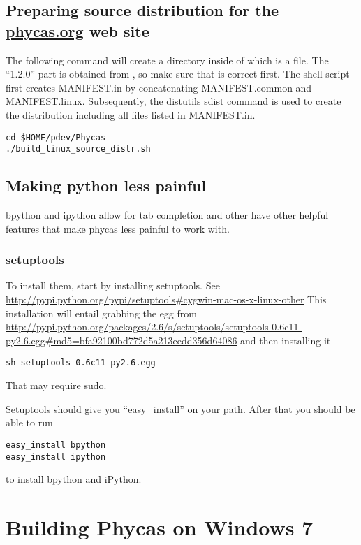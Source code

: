 \begin{enumerate}
\subsection*{Preparing source distribution for the \url{phycas.org} web site}
The following command will create a  directory inside of which is a  file. The ``1.2.0'' part is obtained from , so make sure that is correct first. The shell script first creates MANIFEST.in by concatenating MANIFEST.common and MANIFEST.linux. Subsequently, the distutils sdist command is used to create the distribution including all files listed in MANIFEST.in.
\begin{verbatim}
cd $HOME/pdev/Phycas
./build_linux_source_distr.sh
\end{verbatim}

\subsection*{Making python less painful}
bpython and ipython allow for tab completion and other have other helpful features that make phycas less painful to work with.

\subsubsection*{setuptools}
To install them, start by installing setuptools.  See \url{http://pypi.python.org/pypi/setuptools#cygwin-mac-os-x-linux-other}
This installation  will entail  grabbing the egg from \url{http://pypi.python.org/packages/2.6/s/setuptools/setuptools-0.6c11-py2.6.egg#md5=bfa92100bd772d5a213eedd356d64086}
and then installing it 
\begin{verbatim}
sh setuptools-0.6c11-py2.6.egg
\end{verbatim}
That may require sudo.

Setuptools should give you ``easy\_install'' on your path.
After that you should be able to run
\begin{verbatim}
easy_install bpython
easy_install ipython
\end{verbatim}
to install bpython and iPython.

\section{Building Phycas on Windows 7}


\end{enumerate}
